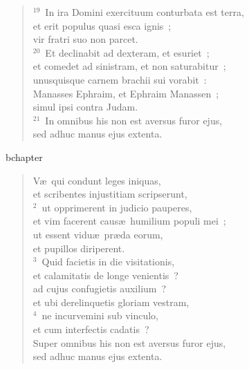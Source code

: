 \begin{verse}
${}^{19}$~In ira Domini exercituum conturbata est terra,\\ et erit populus quasi esca ignis~;\\ vir fratri suo non parcet.\\
${}^{20}$~Et declinabit ad dexteram, et esuriet~;\\ et comedet ad sinistram, et non saturabitur~;\\ unusquisque carnem brachii sui vorabit~:\\ Manasses Ephraim, et Ephraim Manassen~;\\ simul ipsi contra Judam.\\
${}^{21}$~In omnibus his non est aversus furor ejus,\\ sed adhuc manus ejus extenta.\end{verse}


bchapter\begin{verse}\vspace{-19pt}V\ae\ qui condunt leges iniquas,\\ et scribentes injustitiam scripserunt,\\
${}^{2}$~ut opprimerent in judicio pauperes,\\ et vim facerent caus\ae\ humilium populi mei~;\\ ut essent vidu\ae\ pr\ae da eorum,\\ et pupillos diriperent.\\
${}^{3}$~Quid facietis in die visitationis,\\ et calamitatis de longe venientis~?\\ ad cujus confugietis auxilium~?\\ et ubi derelinquetis gloriam vestram,\\
${}^{4}$~ne incurvemini sub vinculo,\\ et cum interfectis cadatis~?\\ Super omnibus his non est aversus furor ejus,\\ sed adhuc manus ejus extenta.\end{verse}


